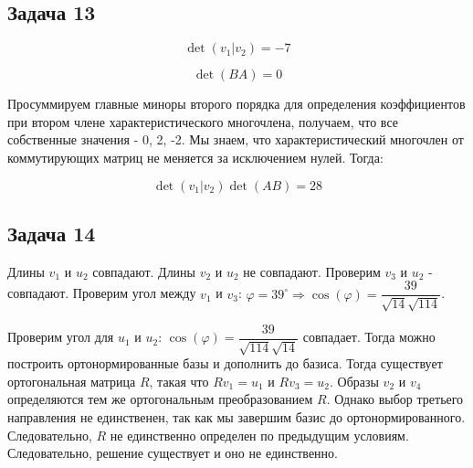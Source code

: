 \documentclass[a4paper,12pt]{article}
\begin{document}
\subsection{Задача 13}

\[
\det(v_1|v_2) = -7
\]

\[
\det(BA) = 0
\]

Просуммируем главные миноры второго порядка для определения коэффициентов при втором члене характеристического многочлена, получаем, что все собственные значения - 0, 2, -2. Мы знаем, что характеристический многочлен от коммутирующих матриц не меняется за исключением нулей. Тогда:

\[
\det(v_1|v_2) \det(AB) = 28
\]

\subsection{Задача 14}

Длины \( v_1 \) и \( u_2 \) совпадают. Длины \( v_2 \) и \( u_2 \) не совпадают. Проверим \( v_3 \) и \( u_2 \) - совпадают. Проверим угол между \( v_1 \) и \( v_3 \): \( \varphi = 39^\circ \Rightarrow \cos(\varphi) = \dfrac{39}{\sqrt{14}\sqrt{114}} \).

Проверим угол для \( u_1 \) и \( u_2 \): \( \cos(\varphi) = \dfrac{39}{\sqrt{114}\sqrt{14}} \) совпадает. Тогда можно построить ортонормированные базы и дополнить до базиса. Тогда существует ортогональная матрица \( R \), такая что \( Rv_1 = u_1 \) и \( Rv_3 = u_2 \). Образы \( v_2 \) и \( v_4 \) определяются тем же ортогональным преобразованием \( R \). Однако выбор третьего направления не единственен, так как мы завершим базис до ортонормированного. Следовательно, \( R \) не единственно определен по предыдущим условиям. Следовательно, решение существует и оно не единственно.
\end{document}
